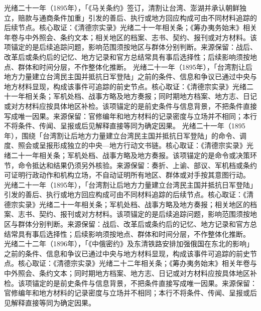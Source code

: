 光绪二十一年（1895年），「《马关条约》签订，清割让台湾、澎湖并承认朝鲜独立，赔款与通商条件加重」引发的善后、执行或地方回应构成可由不同材料追踪的后续节点。核心取证：《清德宗实录》光绪二十一年相关条；《筹办夷务始末》相关年卷与中外照会、条约文本；相关地区的档案、志书、契约、报刊或对方材料。该项锚定的是后续追踪问题，影响范围须按地区与群体分别判断。来源保留：战后、改革后或条约后的记忆、地方记录和官方总结常具有事后选择性；后续影响须按地点、群体和时间分层，不作整体化推断。
光绪二十一年（1895年），「台湾割让后地方力量建立台湾民主国并抵抗日军登陆」之前的条件、信息和争议已通过中央与地方材料显现，构成该事件可追踪的前史节点。核心取证：《清德宗实录》光绪二十一年相关条；军机处档、战事方略及地方奏报；同时期地方档案、地方志、日记或对方材料应按具体地区补检。该项锚定的是前史条件与信息背景，不把条件直接写成唯一因果。来源保留：官修编年和地方材料的记录密度与立场并不相同；本行不将条件、传闻、呈报或后见解释直接等同为确定因果。
光绪二十一年（1895年），围绕「台湾割让后地方力量建立台湾民主国并抵抗日军登陆」的命令、调度、照会或呈报形成独立的中央—地方行动文书链。核心取证：《清德宗实录》光绪二十一年相关条；军机处档、战事方略及地方奏报。该项锚定的是命令或决策环节，命令抵达和结果仍须另外核验。来源保留：奏折、上谕、部议、军机档或条约可证明行政动作和机构立场，不自动证明所有地区、群体或对手按其意图行动。
光绪二十一年（1895年），「台湾割让后地方力量建立台湾民主国并抵抗日军登陆」引发的善后、执行或地方回应构成可由不同材料追踪的后续节点。核心取证：《清德宗实录》光绪二十一年相关条；军机处档、战事方略及地方奏报；相关地区的档案、志书、契约、报刊或对方材料。该项锚定的是后续追踪问题，影响范围须按地区与群体分别判断。来源保留：战后、改革后或条约后的记忆、地方记录和官方总结常具有事后选择性；后续影响须按地点、群体和时间分层，不作整体化推断。
光绪二十二年（1896年），「《中俄密约》及东清铁路安排加强俄国在东北的影响」之前的条件、信息和争议已通过中央与地方材料显现，构成该事件可追踪的前史节点。核心取证：《清德宗实录》光绪二十二年相关条；《筹办夷务始末》相关年卷与中外照会、条约文本；同时期地方档案、地方志、日记或对方材料应按具体地区补检。该项锚定的是前史条件与信息背景，不把条件直接写成唯一因果。来源保留：官修编年和地方材料的记录密度与立场并不相同；本行不将条件、传闻、呈报或后见解释直接等同为确定因果。
